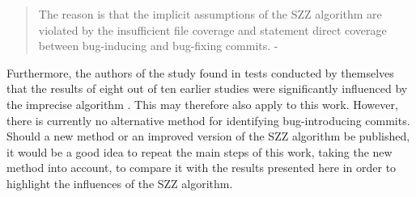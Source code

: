 \begin{quotation}
The reason is that the implicit assumptions of the SZZ algorithm
are violated by the insufficient file coverage and statement direct
coverage between bug-inducing and bug-fixing commits. - \cite{Wen2019}
\end{quotation}

Furthermore, the authors of the study found in tests conducted by themselves that the results of eight out of ten earlier studies were significantly influenced by the imprecise algorithm \cite{Wen2019}. This may therefore also apply to this work. However, there is currently no alternative method for identifying bug-introducing commits. Should a new method or an improved version of the SZZ algorithm be published, it would be a good idea to repeat the main steps of this work, taking the new method into account, to compare it with the results presented here in order to highlight the influences of the SZZ algorithm.